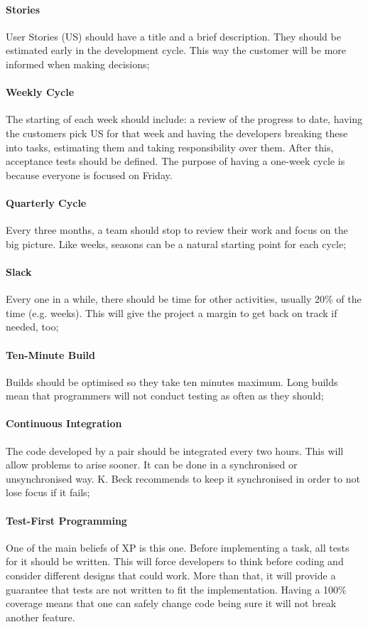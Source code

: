 \documentclass[conference]{IEEEtran}
\begin{document}
\paragraph{Stories} User Stories (US) should have a title and a brief description. They should be estimated early in the development cycle. This way the customer will be more informed when making decisions;
\paragraph{Weekly Cycle} The starting of each week should include: a review of the progress to date, having the customers pick US for that week and having the developers breaking these into tasks, estimating them and taking responsibility over them. After this, acceptance tests should be defined. The purpose of having a one-week cycle is because everyone is focused on Friday.
\paragraph{Quarterly Cycle} Every three months, a team should stop to review their work and focus on the big picture. Like weeks, seasons can be a natural starting point for each cycle;
\paragraph{Slack} Every one in a while, there should be time for other activities, usually 20\% of the time (e.g. weeks). This will give the project a margin to get back on track if needed, too;
\paragraph{Ten-Minute Build} Builds should be optimised so they take ten minutes maximum. Long builds mean that programmers will not conduct testing as often as they should;
\paragraph{Continuous Integration} The code developed by a pair should be integrated every two hours. This will allow problems to arise sooner. It can be done in a synchronised or unsynchronised way. K. Beck recommends to keep it synchronised in order to not lose focus if it fails;
\paragraph{Test-First Programming} One of the main beliefs of XP is this one. Before implementing a task, all tests for it should be written. This will force developers to think before coding and consider different designs that could work. More than that, it will provide a guarantee that tests are not written to fit the implementation. Having a 100\% coverage means that one can safely change code being sure it will not break another feature. \cite{Martin:2009uy}
\end{document}
